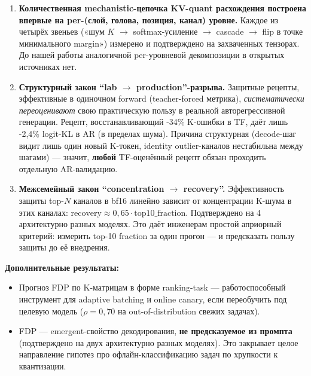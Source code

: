 \documentclass[a4paper,12pt]{article}
\begin{document}
\begin{enumerate}[label=\textbf{Ф.\arabic*.},leftmargin=1.5cm]
\item \textbf{Количественная mechanistic-цепочка KV-quant расхождения
  построена впервые на per-(слой, голова, позиция, канал) уровне.}
  Каждое из четырёх звеньев («шум $K$ $\to$ softmax-усиление $\to$
  cascade $\to$ flip в точке минимального margin») измерено и
  подтверждено на захваченных тензорах. До нашей работы аналогичной
  per-уровневой декомпозиции в открытых источниках нет.
\item \textbf{Структурный закон ``lab $\to$ production''-разрыва.}
  Защитные рецепты, эффективные в одиночном forward (teacher-forced
  метрика), \textit{систематически переоценивают} свою практическую
  пользу в реальной авторегрессивной генерации. Рецепт, восстанавливающий
  -34\% K-ошибки в TF, даёт лишь -2,4\% logit-KL в AR (в пределах шума).
  Причина структурная (decode-шаг видит лишь один новый K-токен, identity
  outlier-каналов нестабильна между шагами) --- значит, \textbf{любой}
  TF-оценённый рецепт обязан проходить отдельную AR-валидацию.
\item \textbf{Межсемейный закон ``concentration $\to$ recovery''.}
  Эффективность защиты top-$N$ каналов в bf16 линейно зависит от
  концентрации K-шума в этих каналах:
  \(\text{recovery} \approx 0{,}65 \cdot \text{top10\_fraction}\).
  Подтверждено на 4 архитектурно разных моделях. Это даёт инженерам
  простой априорный критерий: измерить top-10 fraction за один прогон
  --- и предсказать пользу защиты до её внедрения.
\end{enumerate}

\textbf{Дополнительные результаты:}
\begin{itemize}[leftmargin=*]
\item Прогноз FDP по K-матрицам в форме ranking-task --- работоспособный
  инструмент для adaptive batching и online canary, если переобучить под
  целевую модель ($\rho = 0{,}70$ на out-of-distribution свежих задачах).
\item FDP --- emergent-свойство декодирования, \textbf{не предсказуемое
  из промпта} (подтверждено на двух архитектурно разных моделях). Это
  закрывает целое направление гипотез про офлайн-классификацию задач
  по хрупкости к квантизации.
\end{itemize}

\newpage

\end{document}
